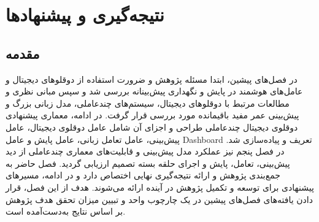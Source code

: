 





\chapter{نتیجه‌گیری و پیشنهادها}
\label{chap:conclusion}

\section{مقدمه}
\label{sec}
در فصل‌های پیشین، ابتدا مسئله پژوهش و ضرورت استفاده از دوقلوهای دیجیتال و عامل‌های هوشمند در پایش و نگهداری پیش‌بینانه بررسی شد و سپس مبانی نظری و مطالعات مرتبط با دوقلوهای دیجیتال، سیستم‌های چندعاملی، مدل زبانی بزرگ و پیش‌بینی عمر مفید باقیمانده مورد بررسی قرار گرفت. در ادامه، معماری پیشنهادی دوقلوی دیجیتال چندعاملی طراحی و اجزای آن شامل عامل دوقلوی دیجیتال، عامل پیش‌بینی، عامل تعامل زبانی، عامل پایش و عامل \gls{Dashboard} تعریف و پیاده‌سازی شد. در فصل پنجم نیز عملکرد مدل پیش‌بینی و قابلیت‌های معماری چندعاملی از دید پیش‌بینی، تعامل، پایش و اجرای حلقه بسته تصمیم ارزیابی گردید. فصل حاضر به جمع‌بندی پژوهش و ارائه نتیجه‌گیری نهایی اختصاص دارد و در ادامه، مسیرهای پیشنهادی برای توسعه و تکمیل پژوهش در آینده ارائه می‌شوند. هدف از این فصل، قرار دادن یافته‌های فصل‌های پیشین در یک چارچوب واحد و تبیین میزان تحقق هدف پژوهش بر اساس نتایج به‌دست‌آمده است.

